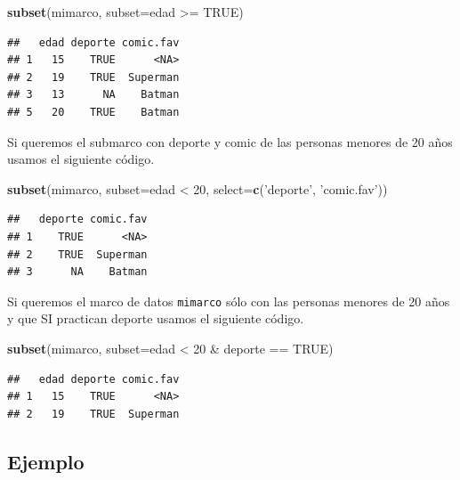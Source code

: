 \documentclass[10pt,]{krantz}
\makeatletter
\newenvironment{Shaded}{\begin{snugshade}}{\end{snugshade}}
\newcommand{\KeywordTok}[1]{\textcolor[rgb]{0.13,0.29,0.53}{\textbf{{#1}}}}
\newcommand{\DataTypeTok}[1]{\textcolor[rgb]{0.13,0.29,0.53}{{#1}}}
\newcommand{\DecValTok}[1]{\textcolor[rgb]{0.00,0.00,0.81}{{#1}}}
\newcommand{\StringTok}[1]{\textcolor[rgb]{0.31,0.60,0.02}{{#1}}}
\newcommand{\OtherTok}[1]{\textcolor[rgb]{0.56,0.35,0.01}{{#1}}}
\newcommand{\NormalTok}[1]{{#1}}
\newenvironment{kframe}{%
\medskip{}
\setlength{\fboxsep}{.8em}
 \def\at@end@of@kframe{}%
 \ifinner\ifhmode%
  \def\at@end@of@kframe{\end{minipage}}%
  \begin{minipage}{\columnwidth}%
 \fi\fi%
 \def\FrameCommand##1{\hskip\@totalleftmargin \hskip-\fboxsep
 \colorbox{shadecolor}{##1}\hskip-\fboxsep
     \hskip-\linewidth \hskip-\@totalleftmargin \hskip\columnwidth}%
 \MakeFramed {\advance\hsize-\width
   \@totalleftmargin\z@ \linewidth\hsize
   \@setminipage}}%
 {\par\unskip\endMakeFramed%
 \at@end@of@kframe}
\renewenvironment{Shaded}{\begin{kframe}}{\end{kframe}}
\makeatother
\begin{document}
\begin{Shaded}
\begin{Highlighting}[]
\KeywordTok{subset}\NormalTok{(mimarco, }\DataTypeTok{subset=}\NormalTok{edad >=}\StringTok{ }\OtherTok{TRUE}\NormalTok{)}
\end{Highlighting}
\end{Shaded}

\begin{verbatim}
##   edad deporte comic.fav
## 1   15    TRUE      <NA>
## 2   19    TRUE  Superman
## 3   13      NA    Batman
## 5   20    TRUE    Batman
\end{verbatim}

Si queremos el submarco con deporte y comic de las personas menores de
20 años usamos el siguiente código.

\begin{Shaded}
\begin{Highlighting}[]
\KeywordTok{subset}\NormalTok{(mimarco, }\DataTypeTok{subset=}\NormalTok{edad <}\StringTok{ }\DecValTok{20}\NormalTok{, }\DataTypeTok{select=}\KeywordTok{c}\NormalTok{(}\StringTok{'deporte'}\NormalTok{, }\StringTok{'comic.fav'}\NormalTok{))}
\end{Highlighting}
\end{Shaded}

\begin{verbatim}
##   deporte comic.fav
## 1    TRUE      <NA>
## 2    TRUE  Superman
## 3      NA    Batman
\end{verbatim}

Si queremos el marco de datos \texttt{mimarco} sólo con las personas
menores de 20 años y que SI practican deporte usamos el siguiente
código.

\begin{Shaded}
\begin{Highlighting}[]
\KeywordTok{subset}\NormalTok{(mimarco, }\DataTypeTok{subset=}\NormalTok{edad <}\StringTok{ }\DecValTok{20} \NormalTok{&}\StringTok{ }\NormalTok{deporte ==}\StringTok{ }\OtherTok{TRUE}\NormalTok{)}
\end{Highlighting}
\end{Shaded}

\begin{verbatim}
##   edad deporte comic.fav
## 1   15    TRUE      <NA>
## 2   19    TRUE  Superman
\end{verbatim}

\subsection*{Ejemplo}\label{ejemplo-4}
\end{document}
